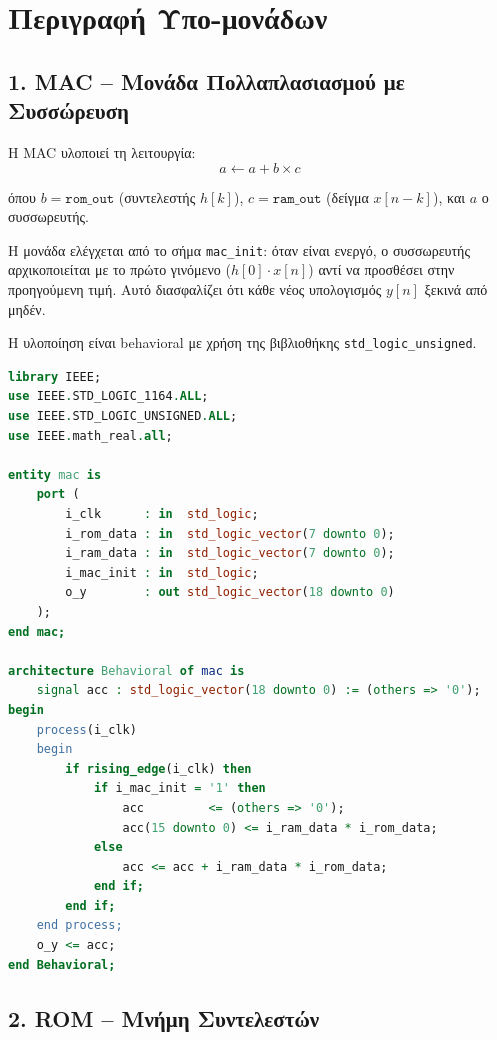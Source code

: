 \documentclass[12pt]{article}
\begin{document}
\section*{Περιγραφή Υπο-μονάδων}

\subsection*{1. MAC -- Μονάδα Πολλαπλασιασμού με Συσσώρευση}

Η MAC υλοποιεί τη λειτουργία:
\[
    a \leftarrow a + b \times c
\]

όπου $b = \texttt{rom\_out}$ (συντελεστής $h[k]$), $c = \texttt{ram\_out}$ (δείγμα $x[n-k]$), και $a$ ο συσσωρευτής.

Η μονάδα ελέγχεται από το σήμα \texttt{mac\_init}: όταν είναι ενεργό, ο συσσωρευτής αρχικοποιείται με το πρώτο γινόμενο ($h[0] \cdot x[n]$) αντί να προσθέσει στην προηγούμενη τιμή. Αυτό διασφαλίζει ότι κάθε νέος υπολογισμός $y[n]$ ξεκινά από μηδέν.

Η υλοποίηση είναι behavioral με χρήση της βιβλιοθήκης \texttt{std\_logic\_unsigned}.

\begin{lstlisting}[language=VHDL]
library IEEE;
use IEEE.STD_LOGIC_1164.ALL;
use IEEE.STD_LOGIC_UNSIGNED.ALL;
use IEEE.math_real.all;

entity mac is
    port (
        i_clk      : in  std_logic;
        i_rom_data : in  std_logic_vector(7 downto 0);
        i_ram_data : in  std_logic_vector(7 downto 0);
        i_mac_init : in  std_logic;
        o_y        : out std_logic_vector(18 downto 0)
    );
end mac;

architecture Behavioral of mac is
    signal acc : std_logic_vector(18 downto 0) := (others => '0');
begin
    process(i_clk)
    begin
        if rising_edge(i_clk) then
            if i_mac_init = '1' then
                acc         <= (others => '0');
                acc(15 downto 0) <= i_ram_data * i_rom_data;
            else
                acc <= acc + i_ram_data * i_rom_data;
            end if;
        end if;
    end process;
    o_y <= acc;
end Behavioral;
\end{lstlisting}

\subsection*{2. ROM -- Μνήμη Συντελεστών}
\end{document}
